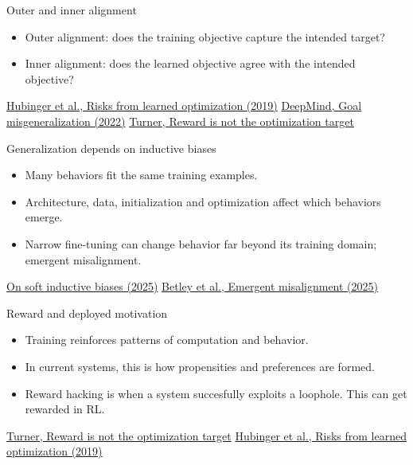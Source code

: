 \documentclass[aspectratio=169,11pt]{beamer}
\newcommand{\sources}[1]{\vfill{\fontsize{6.3}{7.5}\selectfont\color{muted}#1\par}}
\begin{document}
\begin{frame}[t,label=innerouter]{Outer and inner alignment}
\begin{itemize}\setlength{\itemsep}{3.5mm}
\item Outer alignment: does the training objective capture the intended target?
\item Inner alignment: does the learned objective agree with the intended objective?
\end{itemize}
\sources{\href{https://arxiv.org/abs/1906.01820}{Hubinger et al., Risks from learned optimization (2019)} \quad \href{https://deepmind.google/blog/how-undesired-goals-can-arise-with-correct-rewards/}{DeepMind, Goal misgeneralization (2022)} \quad \href{https://www.alignmentforum.org/posts/pdaGN6pQyQarFHXF4}{Turner, Reward is not the optimization target}}
\end{frame}

\begin{frame}[t,label=biases]{Generalization depends on inductive biases}
\begin{itemize}\setlength{\itemsep}{3.5mm}
\item Many behaviors fit the same training examples.
\item Architecture, data, initialization and optimization affect which behaviors emerge.
\item Narrow fine-tuning can change behavior far beyond its training domain; emergent misalignment.
\end{itemize}
\sources{\href{https://arxiv.org/abs/2503.02113}{On soft inductive biases (2025)} \quad \href{https://arxiv.org/abs/2502.17424}{Betley et al., Emergent misalignment (2025)}}
\end{frame}


\begin{frame}[t,label=rewardlens]{Reward and deployed motivation}
\begin{itemize}\setlength{\itemsep}{3.5mm}
\item Training reinforces patterns of computation and behavior.
\item In current systems, this is how propensities and preferences are formed.
\item Reward hacking is when a system succesfully exploits a loophole. This can get rewarded in RL.
\end{itemize}
\sources{\href{https://www.alignmentforum.org/posts/pdaGN6pQyQarFHXF4}{Turner, Reward is not the optimization target} \quad \href{https://arxiv.org/abs/1906.01820}{Hubinger et al., Risks from learned optimization (2019)}}
\end{frame}
\end{document}
